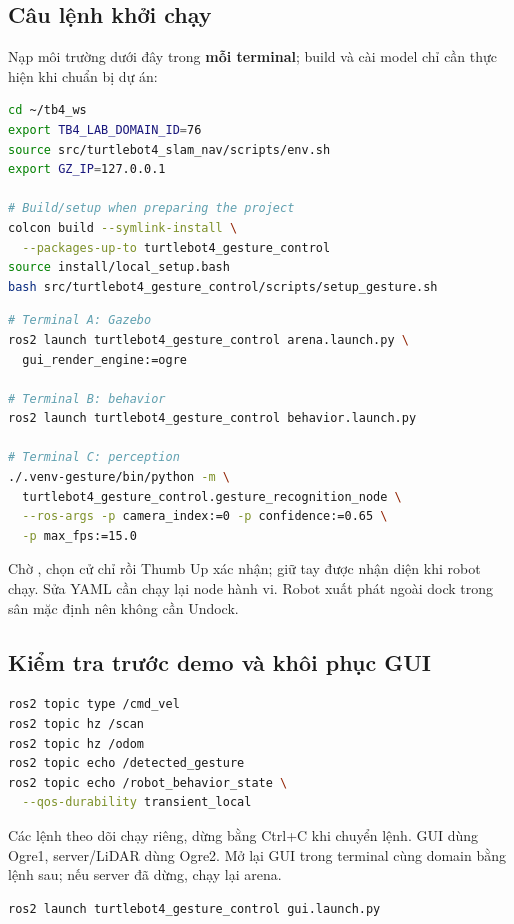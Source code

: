 \documentclass[12pt,a4paper]{article}
\newcommand{\code}[1]{\texttt{\detokenize{#1}}}
\begin{document}
\subsection{Câu lệnh khởi chạy}
Nạp môi trường dưới đây trong \textbf{mỗi terminal}; build và cài model chỉ cần thực hiện khi chuẩn bị dự án:
\begin{lstlisting}[language=bash]
cd ~/tb4_ws
export TB4_LAB_DOMAIN_ID=76
source src/turtlebot4_slam_nav/scripts/env.sh
export GZ_IP=127.0.0.1

# Build/setup when preparing the project
colcon build --symlink-install \
  --packages-up-to turtlebot4_gesture_control
source install/local_setup.bash
bash src/turtlebot4_gesture_control/scripts/setup_gesture.sh
\end{lstlisting}
\begin{lstlisting}[language=bash,caption={Ba lệnh vận hành chạy trong ba terminal đã nạp môi trường.}]
# Terminal A: Gazebo
ros2 launch turtlebot4_gesture_control arena.launch.py \
  gui_render_engine:=ogre

# Terminal B: behavior
ros2 launch turtlebot4_gesture_control behavior.launch.py

# Terminal C: perception
./.venv-gesture/bin/python -m \
  turtlebot4_gesture_control.gesture_recognition_node \
  --ros-args -p camera_index:=0 -p confidence:=0.65 \
  -p max_fps:=15.0
\end{lstlisting}
Chờ \code{ready=True}, chọn cử chỉ rồi Thumb Up xác nhận; giữ tay được nhận diện khi robot chạy. Sửa YAML cần chạy lại node hành vi. Robot xuất phát ngoài dock trong sân mặc định nên không cần Undock.

\subsection{Kiểm tra trước demo và khôi phục GUI}
\begin{lstlisting}[language=bash]
ros2 topic type /cmd_vel
ros2 topic hz /scan
ros2 topic hz /odom
ros2 topic echo /detected_gesture
ros2 topic echo /robot_behavior_state \
  --qos-durability transient_local
\end{lstlisting}
Các lệnh theo dõi chạy riêng, dừng bằng Ctrl+C khi chuyển lệnh. GUI dùng Ogre1, server/LiDAR dùng Ogre2. Mở lại GUI trong terminal cùng domain bằng lệnh sau; nếu server đã dừng, chạy lại arena.
\begin{lstlisting}[language=bash]
ros2 launch turtlebot4_gesture_control gui.launch.py
\end{lstlisting}
\end{document}
